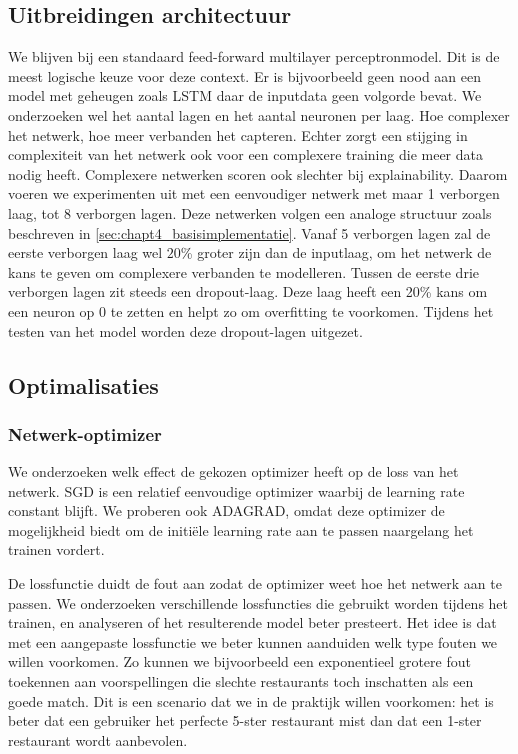 \subsection{Uitbreidingen architectuur}
We blijven bij een standaard feed-forward multilayer perceptronmodel. Dit is de meest logische keuze voor deze context. Er is bijvoorbeeld geen nood aan een model met geheugen zoals LSTM daar de inputdata geen volgorde bevat. 
We onderzoeken wel het aantal lagen en het aantal neuronen per laag. Hoe complexer het netwerk, hoe meer verbanden het capteren. Echter zorgt een stijging in complexiteit van het netwerk ook voor een complexere training die meer data nodig heeft. Complexere netwerken scoren ook slechter bij explainability. Daarom voeren we experimenten uit met een eenvoudiger netwerk met maar 1 verborgen laag, tot 8 verborgen lagen. Deze netwerken volgen een analoge structuur zoals beschreven in \autoref{sec:chapt4_basisimplementatie}. Vanaf 5 verborgen lagen zal de eerste verborgen laag wel $20$\% groter zijn dan de inputlaag, om het netwerk de kans te geven om complexere verbanden te modelleren. Tussen de eerste drie verborgen lagen zit steeds een dropout-laag. Deze laag heeft een 20\% kans om een neuron op 0 te zetten en helpt zo om overfitting te voorkomen. \cite{nn_dropout} Tijdens het testen van het model worden deze dropout-lagen uitgezet.

\subsection{Optimalisaties}
\subsubsection{Netwerk-optimizer}
We onderzoeken welk effect de gekozen optimizer heeft op de loss van het netwerk. SGD is een relatief eenvoudige optimizer waarbij de learning rate constant blijft. We proberen ook ADAGRAD, omdat deze optimizer de mogelijkheid biedt om de initiële learning rate aan te passen naargelang het trainen vordert.

De lossfunctie duidt de fout aan zodat de optimizer weet hoe het netwerk aan te passen. We onderzoeken verschillende lossfuncties die gebruikt worden tijdens het trainen, en analyseren of het resulterende model beter presteert. Het idee is dat met een aangepaste lossfunctie we beter kunnen aanduiden welk type fouten we willen voorkomen. Zo kunnen we bijvoorbeeld een exponentieel grotere fout toekennen aan voorspellingen die slechte restaurants toch inschatten als een goede match. Dit is een scenario dat we in de praktijk willen voorkomen: het is beter dat een gebruiker het perfecte 5-ster restaurant mist dan dat een 1-ster restaurant wordt aanbevolen.

